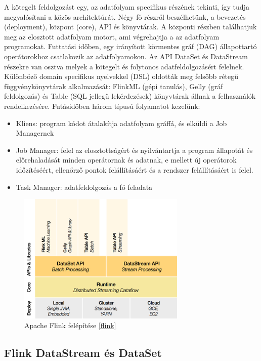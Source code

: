 \documentclass[a4paper,12pt]{article}
\begin{document}
A kötegelt feldolgozást egy, az adatfolyam specifikus részének tekinti, így tudja megvalósítani a közös architektúrát. Négy fő részről beszélhetünk, a bevezetés (deployment), központ (core), API és könyvtárak. A központi részben találhatjuk meg az elosztott adatfolyam motort, ami végrehajtja a az adatfolyam programokat. Futtatási időben, egy irányított körmentes gráf (DAG) állapottartó operátorokhoz csatlakozik az adatfolyamokon. Az API DataSet és DataStream részekre van osztva melyek a kötegelt és folytonos adatfeldolgozásért felelnek. Különböző domain specifikus nyelvekkel (DSL) oldották meg felsőbb rétegű függvénykönyvtárak alkalmazását: FlinkML (gépi tanulás), Gelly (gráf feldolgozás) és Table (SQL jellegű lekérdezések) könyvtárak állnak a felhasználók rendelkezésére.  Futásidőben három típusú folyamatot kezelünk:
 
\begin{itemize}
\item Kliens: program kódot átalakítja adatfolyam gráffá, és elküldi a Job Managernek
\item Job Manager: felel az elosztottságért és nyilvántartja a program állapotát és előrehaladását minden operátornak és adatnak, e mellett új operátorok időzítéséért, ellenőrző pontok felállításáért és a rendszer felállításáért is felel.
\item Task Manager: adatfeldolgozás a fő feladata
\end{itemize}

\begin{figure}[H]
\centering
\includegraphics[width=80mm]{img/flink.png}
\caption{Apache Flink felépítése \ref{flink} \label{apache_flink}}
\end{figure}

\subsection{Flink DataStream és DataSet}
\end{document}
